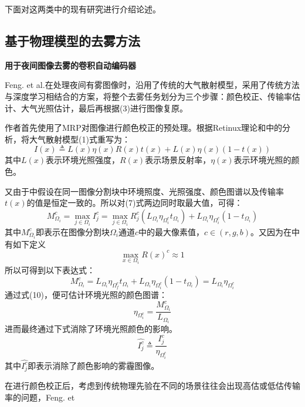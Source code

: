 \begin{multicols}{2}
下面对这两类中的现有研究进行介绍论述。
\subsection{基于物理模型的去雾方法}
\noindent\textbf{用于夜间图像去雾的卷积自动编码器}

Feng. et al.\cite{17}在处理夜间有雾图像时，沿用了传统的大气散射模型，采用了传统方法与深度学习相结合的方案，将整个去雾任务划分为三个步骤：颜色校正、传输率估计、大气光照估计，最后再根据(3)进行图像复原。

作者首先使用了MRP\cite{5}对图像进行颜色校正的预处理。根据Retinux理论\cite{18}和\cite{5}中的分析，将大气散射模型(1)式重写为：
\begin{equation}
	I(x)\triangleq L(x)\eta(x)R(x)t(x)+L(x)\eta(x)(1-t(x))
\end{equation}
其中$L(x)$表示环境光照强度，$R(x)$表示场景反射率，$\eta(x)$表示环境光照的颜色。

又由于\cite{5}中假设在同一图像分割块中环境照度、光照强度、颜色图谱以及传输率$t(x)$的值是恒定一致的。所以对(7)式两边同时取最大值，可得：
\begin{equation}
	M_{\Omega_i}^c=\mathop{\max}_{j\in \Omega_i} I_j^c = \mathop{\max}_{j\in \Omega_i} R_j^c(L_{\Omega_i} \eta_{\Omega_i^c}t_{\Omega_i})+L_{\Omega_i}\eta_{\Omega_i^c}(1-t_{\Omega_i})
\end{equation}
其中$M_{\Omega_i}^c$即表示在图像分割块$\Omega_i$通道$c$中的最大像素值，$c\in (r,g,b)$。又因为在\cite{5}中有如下定义
\begin{equation}
	\mathop{\max}_{x\in \Omega_i} R(x)^c\approx 1
\end{equation}
所以可得到以下表达式：
\begin{equation}
	M_{\Omega_i}^c=L_{\Omega_i} \eta_{\Omega_f^c}t_{\Omega_i}+L_{\Omega_i}\eta_{\Omega_i^c}(1-t_{\Omega_i})=L_{\Omega_i} \eta_{\Omega_i^c}
\end{equation}
通过式(10)，便可估计环境光照的颜色图谱：
\begin{equation}
	 \eta_{\Omega_i^c} = \frac{M_{\Omega_i}^c}{L_{\Omega_i}}
\end{equation}
进而最终通过下式消除了环境光照颜色的影响。
\begin{equation}
	\hat{I_j^c}\triangleq\frac{I_j^c}{\eta_{\Omega_i^c}}
\end{equation}
其中$\hat{I_j^c}$即表示消除了颜色影响的雾霾图像。

在进行颜色校正后，考虑到传统物理先验在不同的场景往往会出现高估或低估传输率的问题，Feng. et 
\end{multicols}
